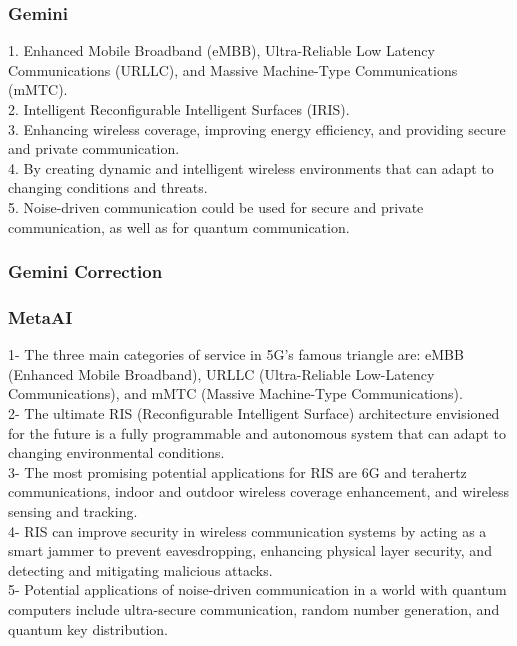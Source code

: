 \subsubsection{Gemini}
\begin{tcolorbox}[breakable]
1. Enhanced Mobile Broadband (eMBB), Ultra-Reliable Low Latency Communications (URLLC), and Massive Machine-Type Communications (mMTC).\\
2. Intelligent Reconfigurable Intelligent Surfaces (IRIS).\\
3. Enhancing wireless coverage, improving energy efficiency, and providing secure and private communication.\\
4. By creating dynamic and intelligent wireless environments that can adapt to changing conditions and threats.\\
5. Noise-driven communication could be used for secure and private communication, as well as for quantum communication.\\
\end{tcolorbox}
\subsubsection{Gemini Correction}
\begin{tcolorbox}[breakable]
    
\end{tcolorbox}
\subsubsection{MetaAI}
\begin{tcolorbox}[breakable]
1- The three main categories of service in 5G's famous triangle are: eMBB (Enhanced Mobile Broadband), URLLC (Ultra-Reliable Low-Latency Communications), and mMTC (Massive Machine-Type Communications).\\
2- The ultimate RIS (Reconfigurable Intelligent Surface) architecture envisioned for the future is a fully programmable and autonomous system that can adapt to changing environmental conditions.\\
3- The most promising potential applications for RIS are 6G and terahertz communications, indoor and outdoor wireless coverage enhancement, and wireless sensing and tracking.\\
4- RIS can improve security in wireless communication systems by acting as a smart jammer to prevent eavesdropping, enhancing physical layer security, and detecting and mitigating malicious attacks.\\
5- Potential applications of noise-driven communication in a world with quantum computers include ultra-secure communication, random number generation, and quantum key distribution.\\
\end{tcolorbox}

